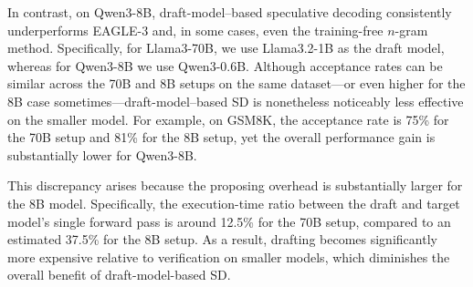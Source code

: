In contrast, on Qwen3-8B, draft-model–based speculative decoding consistently underperforms EAGLE-3 and, in some cases, even the training-free $n$-gram method.
Specifically, for Llama3-70B, we use Llama3.2-1B as the draft model, whereas for Qwen3-8B we use Qwen3-0.6B. Although acceptance rates can be similar across the 70B and 8B setups on the same dataset—or even higher for the 8B case sometimes—draft-model–based SD is nonetheless noticeably less effective on the smaller model. For example, on GSM8K, the acceptance rate is 75\% for the 70B setup and 81\% for the 8B setup, yet the overall performance gain is substantially lower for Qwen3-8B.

This discrepancy arises because the proposing overhead is substantially larger for the 8B model. Specifically, the execution-time ratio between the draft and target model's single forward pass is around 12.5\% for the 70B setup, compared to an estimated 37.5\% for the 8B setup. As a result, drafting becomes significantly more expensive relative to verification on smaller models, which diminishes the overall benefit of draft-model-based SD.






